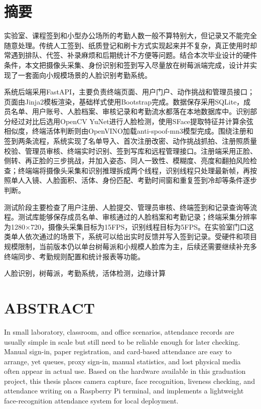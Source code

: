 \documentclass[UTF8]{heuthesis}
\begin{document}
\makeCover

\frontmatter
\chapter*{摘\quad 要}
实验室、课程签到和小型办公场所的考勤人数一般不算特别大，但记录又不能完全随意处理。传统人工签到、纸质登记和刷卡方式实现起来并不复杂，真正使用时却常遇到排队、代签、补录麻烦和后期统计不方便等问题。结合本次毕业设计的硬件条件，本文把摄像头采集、身份识别和签到写入尽量放在树莓派端完成，设计并实现了一套面向小规模场景的人脸识别考勤系统。

系统后端采用FastAPI，主要负责终端页面、用户门户、动作挑战和管理员接口；页面由Jinja2模板渲染，基础样式使用Bootstrap完成。数据保存采用SQLite，成员名单、用户账号、人脸档案、审核记录和考勤流水都落在本地数据库中。识别部分经过对比后选用OpenCV YuNet进行人脸检测，使用SFace提取特征并计算余弦相似度，终端活体判断则由OpenVINO加载anti-spoof-mn3模型完成。围绕注册和签到两条流程，系统实现了名单导入、首次注册改密、动作挑战抓拍、注册照质量校验、管理员审核、终端实时识别、签到写库和远程管理接口。注册端采用正脸、侧转、再正脸的三步挑战，并加入姿态、同人一致性、模糊度、亮度和翻拍风险检查；终端端将摄像头采集和识别推理拆成两个线程，识别线程只处理最新帧，再按照单人入镜、人脸面积、活体、身份匹配、考勤时间窗和重复签到冷却等条件逐步判断。

测试阶段主要检查了用户注册、人脸提交、管理员审核、终端签到和记录查询等流程。测试库能够保存成员名单、审核通过的人脸档案和考勤记录；终端采集分辨率为1280×720，摄像头采集目标为15FPS，识别线程目标为5FPS。在实验室门口这类单人依次通过的场景下，系统可以给出实时反馈并写入签到记录。受硬件和项目规模限制，当前版本仍以单台树莓派和小规模人脸库为主，后续还需要继续补充多终端同步、考勤规则配置和统计报表等功能。


\par{}人脸识别，树莓派，考勤系统，活体检测，边缘计算

\clearpage
\chapter*{ABSTRACT}
In small laboratory, classroom, and office scenarios, attendance records are usually simple in scale but still need to be reliable enough for later checking. Manual sign-in, paper registration, and card-based attendance are easy to arrange, yet queues, proxy sign-in, manual statistics, and lost physical media often appear in actual use. Based on the hardware available in this graduation project, this thesis places camera capture, face recognition, liveness checking, and attendance writing on a Raspberry Pi terminal, and implements a lightweight face-recognition attendance system for local deployment.
\end{document}
